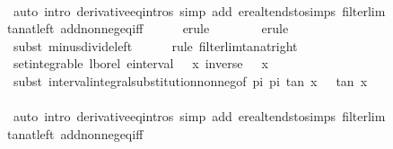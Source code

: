 \documentclass[leqno]{article}
\theoremstyle{definition}
\begin{document}
\begin{figure}
\begin{isabellebody}
\ \ \ \ \isamarkupfalse%
\ {\isacharparenleft}auto\ intro{\isacharcolon}\ derivative{\isacharunderscore}eq{\isacharunderscore}intros\ simp\ add{\isacharcolon}\ ereal{\isacharunderscore}tendsto{\isacharunderscore}simps\ filterlim{\isacharunderscore}tan{\isacharunderscore}at{\isacharunderscore}left\ add{\isacharunderscore}nonneg{\isacharunderscore}eq{\isacharunderscore}{}{\isacharunderscore}iff{\isacharparenright}\isanewline
\ \ \ \ \isamarkupfalse%
\ {\isacharparenleft}erule\ {\isacharparenleft}{}{\isacharparenright}\ {}{\isacharparenright}\isanewline
\ \ \ \ \isamarkupfalse%
\ {\isacharparenleft}erule\ {\isacharparenleft}{}{\isacharparenright}\ {}{\isacharparenright}\isanewline
\ \ \ \ \isamarkupfalse%
\ {\isacharparenleft}subst\ minus{\isacharunderscore}divide{\isacharunderscore}left{\isacharparenright}{\isacharplus}\isanewline
\ \ \ \ \isamarkupfalse%
\ {\isacharparenleft}rule\ filterlim{\isacharunderscore}tan{\isacharunderscore}at{\isacharunderscore}right{\isacharparenright}\isanewline
\ \ \isamarkupfalse%
\ {\isachardoublequoteopen}set{\isacharunderscore}integrable\ lborel\ {\isacharparenleft}einterval\ {\isacharparenleft}{\isacharminus}{\isasyminfinity}{\isacharparenright}\ {\isasyminfinity}{\isacharparenright}\ {\isacharparenleft}{\isasymlambda}x{\isachardot}\ inverse\ {\isacharparenleft}{}\ {\isacharplus}\ x{\isacharcircum}{}{\isacharparenright}{\isacharparenright}{\isachardoublequoteclose}\isanewline
\ \ \ \ \isamarkupfalse%
\ {\isacharparenleft}subst\ interval{\isacharunderscore}integral{\isacharunderscore}substitution{\isacharunderscore}nonneg{\isacharbrackleft}of\ {\isachardoublequoteopen}{\isacharminus}pi{\isacharslash}{}{\isachardoublequoteclose}\ {\isachardoublequoteopen}pi{\isacharslash}{}{\isachardoublequoteclose}\ tan\ {\isachardoublequoteopen}{\isasymlambda}x{\isachardot}\ {}\ {\isacharplus}\ {\isacharparenleft}tan\ x{\isacharparenright}{\isacharcircum}{}{\isachardoublequoteclose}{\isacharbrackright}{\isacharparenright}\isanewline
\ \ \ \ \isamarkupfalse%
\ {\isacharparenleft}auto\ intro{\isacharcolon}\ derivative{\isacharunderscore}eq{\isacharunderscore}intros\ simp\ add{\isacharcolon}\ ereal{\isacharunderscore}tendsto{\isacharunderscore}simps\ filterlim{\isacharunderscore}tan{\isacharunderscore}at{\isacharunderscore}left\ add{\isacharunderscore}nonneg{\isacharunderscore}eq{\isacharunderscore}{}{\isacharunderscore}iff{\isacharparenright}\isanewline

\end{isabellebody}
\end{figure}
\end{document}

